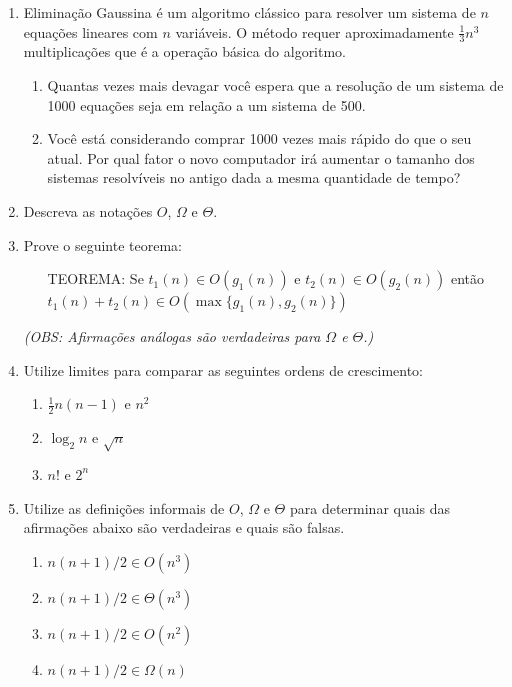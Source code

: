 \documentclass{article}
\begin{document}
\begin{enumerate}
    \item Eliminação Gaussina é um algoritmo clássico para resolver um sistema de $n$ equações lineares com $n$ variáveis. O método requer aproximadamente $\frac{1}{3}n^3$ multiplicações que é a operação básica do algoritmo.
    \begin{enumerate}
        \item Quantas vezes mais devagar você espera que a resolução de um sistema de 1000 equações seja em relação a um sistema de 500.
        \item Você está considerando comprar 1000 vezes mais rápido do que o seu atual. Por qual fator o novo computador irá aumentar o tamanho dos sistemas resolvíveis no antigo dada a mesma quantidade de tempo? 
    \end{enumerate}
    
    \item Descreva as notações $O$, $\Omega$ e $\Theta$.
    
    \item Prove o seguinte teorema:
    
    \begin{enumerate}
        \item[TEOREMA: ] Se $t_1(n) \in O(g_1(n))$ e $t_2(n) \in O(g_2(n))$ então $ t_1(n) + t_2(n) \in O(\max\{g_1(n),g_2(n)\}) $
    \end{enumerate}
    
    \textit{(OBS: Afirmações análogas são verdadeiras para $\Omega$ e $\Theta$.)}
    
    \item Utilize limites para comparar as seguintes ordens de crescimento:
    \begin{enumerate}
        \item $\frac{1}{2}n(n-1)$ e $n^2$
        \item $\log_2n$ e $\sqrt{n}$
        \item $n!$ e $2^n$
    \end{enumerate}
    
    \item Utilize as definições informais de $O$, $\Omega$ e $\Theta$ para determinar quais das afirmações abaixo são verdadeiras e quais são falsas.
    
    \begin{enumerate}
        \item $n(n+1)/2 \in O(n^3)$
        \item $n(n+1)/2 \in \Theta(n^3)$
        \item $n(n+1)/2 \in O(n^2)$
        \item $n(n+1)/2 \in \Omega(n)$
    \end{enumerate}
    

\end{enumerate}
\end{document}
